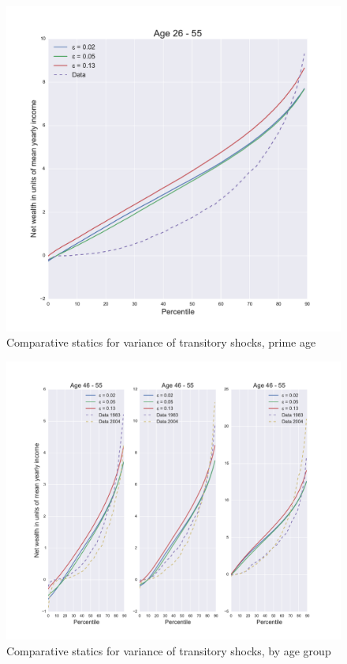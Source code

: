 \begin{figure}
\includegraphics[width=\columnwidth]{comp_stat_eps}
\caption{Comparative statics for variance of transitory shocks, prime age}
\label{fig:comp_stat_eps}
\end{figure}

\begin{figure}
\includegraphics[width=\columnwidth]{comp_stat_eps_agedetail}
\caption{Comparative statics for variance of transitory shocks, by age group}
\label{fig:comp_stat_eps_agedetail}
\end{figure}

